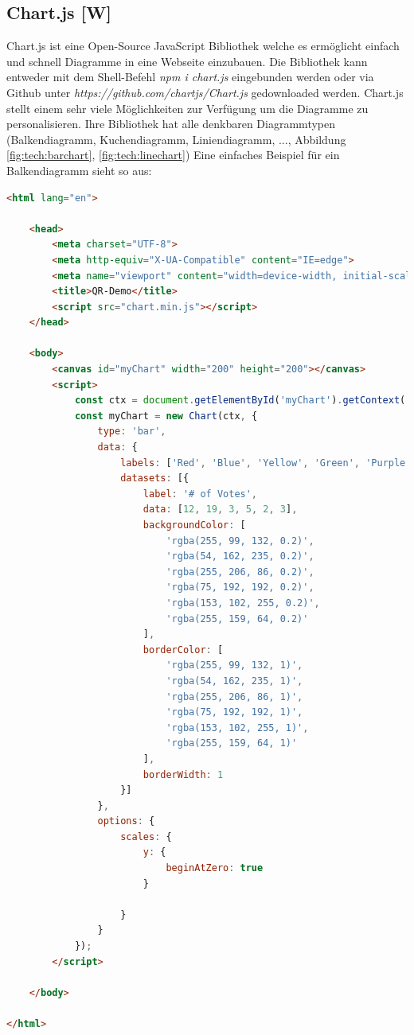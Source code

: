 \subsection{Chart.js [W]}
Chart.js ist eine Open-Source JavaScript Bibliothek welche es ermöglicht einfach und schnell Diagramme
in eine Webseite einzubauen. Die Bibliothek kann entweder mit dem Shell-Befehl \textit{npm i chart.js} eingebunden werden oder via Github unter
\textit{https://github.com/chartjs/Chart.js} gedownloaded werden. Chart.js stellt einem sehr
viele Möglichkeiten zur Verfügung um die Diagramme zu personalisieren.
Ihre Bibliothek hat alle denkbaren Diagrammtypen (Balkendiagramm, Kuchendiagramm, Liniendiagramm, ..., Abbildung \ref{fig:tech:barchart}, \ref{fig:tech:linechart})
Eine einfaches Beispiel für ein Balkendiagramm sieht so aus:
\begin{lstlisting}[language=html,caption=Balkendiagramm HTML Code,label=lst:tech:gaussianBlur]
<html lang="en">

    <head>
        <meta charset="UTF-8">
        <meta http-equiv="X-UA-Compatible" content="IE=edge">
        <meta name="viewport" content="width=device-width, initial-scale=1.0">
        <title>QR-Demo</title>
        <script src="chart.min.js"></script>
    </head>

    <body>
        <canvas id="myChart" width="200" height="200"></canvas>
        <script>
            const ctx = document.getElementById('myChart').getContext('2d');
            const myChart = new Chart(ctx, {
                type: 'bar',
                data: {
                    labels: ['Red', 'Blue', 'Yellow', 'Green', 'Purple', 'Orange'],
                    datasets: [{
                        label: '# of Votes',
                        data: [12, 19, 3, 5, 2, 3],
                        backgroundColor: [
                            'rgba(255, 99, 132, 0.2)',
                            'rgba(54, 162, 235, 0.2)',
                            'rgba(255, 206, 86, 0.2)',
                            'rgba(75, 192, 192, 0.2)',
                            'rgba(153, 102, 255, 0.2)',
                            'rgba(255, 159, 64, 0.2)'
                        ],
                        borderColor: [
                            'rgba(255, 99, 132, 1)',
                            'rgba(54, 162, 235, 1)',
                            'rgba(255, 206, 86, 1)',
                            'rgba(75, 192, 192, 1)',
                            'rgba(153, 102, 255, 1)',
                            'rgba(255, 159, 64, 1)'
                        ],
                        borderWidth: 1
                    }]
                },
                options: {
                    scales: {
                        y: {
                            beginAtZero: true
                        }
                        
                    }
                }
            });
        </script>

    </body>

</html>
\end{lstlisting}
